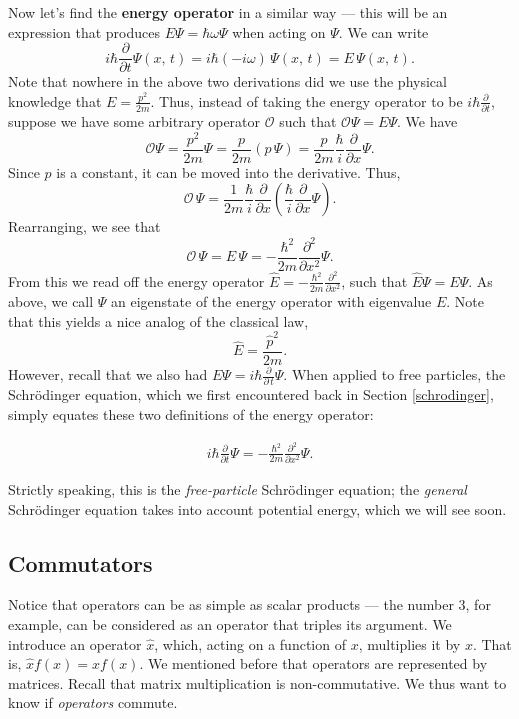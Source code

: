 Now let's find the \textbf{energy operator} in a similar way --- this will be an expression that produces $E\Psi=\hbar\omega\Psi$ when acting on $\Psi$. We can write $$i\hbar\frac{\partial}{\partial t}\Psi(x,\,t)=i\hbar(-i\omega)\,\Psi(x,\,t)=E\,\Psi(x,\,t).$$Note that nowhere in the above two derivations did we use the physical knowledge that $E=\frac{p^2}{2m}$. Thus, instead of taking the energy operator to be $i\hbar\frac{\partial}{\partial t}$, suppose we have some arbitrary operator $\mathcal{O}$ such that $\mathcal{O}\Psi=E\Psi$. We have $$\mathcal{O}\Psi=\frac{p^2}{2m}\Psi=\frac{p}{2m}(p\,\Psi)=\frac{p}{2m}\frac{\hbar}{i}\frac{\partial}{\partial x}\Psi.$$Since $p$ is a constant, it can be moved into the derivative. Thus, $$\mathcal{O}\,\Psi=\frac{1}{2m}\frac{\hbar}{i}\frac{\partial}{\partial x}(\frac{\hbar}{i}\frac{\partial}{\partial x}\Psi).$$Rearranging, we see that $$\mathcal{O}\,\Psi=E\,\Psi=-\frac{\hbar^2}{2m}\frac{\partial^2}{\partial x^2}\Psi.$$From this we read off the energy operator $\hat{E}=-\frac{\hbar^2}{2m}\frac{\partial^2}{\partial x^2}$, such that $\hat{E}\Psi=E\Psi$. As above, we call $\Psi$ an eigenstate of the energy operator with eigenvalue $E$. Note that this yields a nice analog of the classical law, $$\hat{E}=\frac{\hat{p}^2}{2m}.$$However, recall that we also had $E\Psi=i\hbar\frac{\partial}{\partial\,t}\Psi$. When applied to free particles, the Schrödinger equation, which we first encountered back in Section \ref{schrodinger}, simply equates these two definitions of the energy operator:
\begin{Dequation}
    \begin{align*}
        i\hbar\frac{\partial}{\partial t}\Psi=-\frac{\hbar^2}{2m}\frac{\partial^2}{\partial x^2}\Psi. \tag{Schrödinger equation}
    \end{align*}
\end{Dequation}
Strictly speaking, this is the \textit{free-particle} Schrödinger equation; the \textit{general} Schrödinger equation takes into account potential energy, which we will see soon.

\subsection{Commutators}\label{commutators}

Notice that operators can be as simple as scalar products --- the number $3$, for example, can be considered as an operator that triples its argument. We introduce an operator $\hat{x}$, which, acting on a function of $x$, multiplies it by $x$. That is, $\hat{x}f(x)=xf(x)$. We mentioned before that operators are represented by matrices. Recall that matrix multiplication is non-commutative. We thus want to know if \textit{operators} commute.


